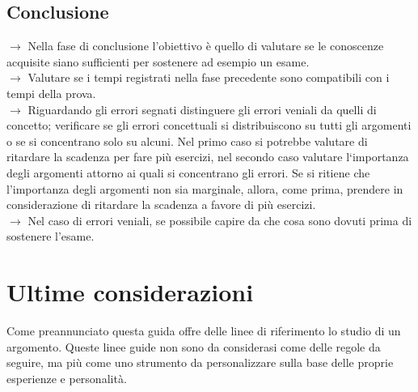 \documentclass[11pt,a4paper]{article}
\begin{document}
\subsection{Conclusione}
$\rightarrow$ Nella fase di conclusione l'obiettivo è quello di valutare se le conoscenze acquisite siano sufficienti per sostenere ad esempio un esame. \\
$\rightarrow$ Valutare se i tempi registrati nella fase precedente sono compatibili con i tempi della prova.\\
$\rightarrow$ Riguardando gli errori segnati distinguere gli errori veniali da quelli di concetto; verificare se gli errori concettuali si distribuiscono su tutti gli argomenti o se si concentrano solo su alcuni.  Nel primo caso si potrebbe valutare di ritardare la scadenza per fare più esercizi, nel secondo caso valutare l`importanza degli argomenti attorno ai quali si concentrano gli errori. Se si ritiene che l'importanza degli argomenti non sia marginale, allora, come prima, prendere in considerazione di ritardare la scadenza a favore di più esercizi.\\
$\rightarrow$ Nel caso di errori veniali, se possibile capire da che cosa sono dovuti prima di sostenere l'esame.\\

\section{Ultime considerazioni}
Come preannunciato questa guida offre delle linee di riferimento lo studio di un argomento. Queste linee guide non sono da considerasi come delle regole da seguire, ma più come uno strumento da personalizzare sulla base delle proprie esperienze e personalità. \\
	
\end{document}
